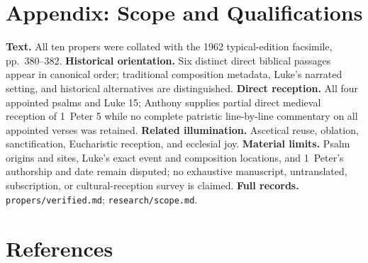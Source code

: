 
\section*{Appendix: Scope and Qualifications}

\begin{studyframe}
\textbf{Text.} All ten propers were collated with the 1962 typical-edition facsimile, pp.~380--382. \textbf{Historical orientation.} Six distinct direct biblical passages appear in canonical order; traditional composition metadata, Luke's narrated setting, and historical alternatives are distinguished. \textbf{Direct reception.} All four appointed psalms and Luke 15; Anthony supplies partial direct medieval reception of 1~Peter 5 while no complete patristic line-by-line commentary on all appointed verses was retained. \textbf{Related illumination.} Ascetical reuse, oblation, sanctification, Eucharistic reception, and ecclesial joy. \textbf{Material limits.} Psalm origins and sites, Luke's exact event and composition locations, and 1~Peter's authorship and date remain disputed; no exhaustive manuscript, untranslated, subscription, or cultural-reception survey is claimed. \textbf{Full records.} \nolinkurl{propers/verified.md}; \nolinkurl{research/scope.md}.
\end{studyframe}

\section*{References}

